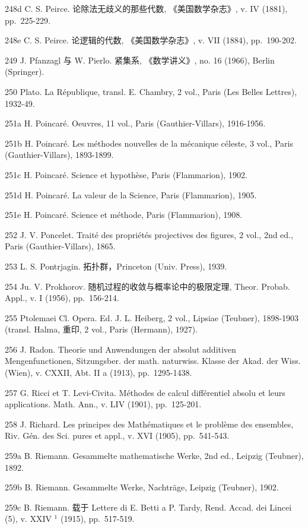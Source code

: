 248d C. S. Peirce. 论除法无歧义的那些代数, 《美国数学杂志》, v. IV (1881), pp.~225-229.

248e C. S. Peirce. 论逻辑的代数, 《美国数学杂志》, v. VII (1884), pp.~190-202.

249 J. Pfanzagl 与 W. Pierlo. 紧集系, 《数学讲义》, no. 16 (1966), Berlin (Springer).

250 Plato. La République, transl. E. Chambry, 2 vol., Paris (Les Belles Lettres), 1932-49.

251a H. Poincaré. Oeuvres, 11 vol., Paris (Gauthier-Villars), 1916-1956.

251b H. Poincaré. Les méthodes nouvelles de la mécanique céleste, 3 vol., Paris (Gauthier-Villars), 1893-1899.

251c H. Poincaré. Science et hypothèse, Paris (Flammarion), 1902.

251d H. Poincaré. La valeur de la Science, Paris (Flammarion), 1905.

251e H. Poincaré. Science et méthode, Paris (Flammarion), 1908.

252 J. V. Poncelet. Traité des propriétés projectives des figures, 2 vol., 2nd ed., Paris (Gauthier-Villars), 1865.

253 L. S. Pontrjagin. 拓扑群，Princeton (Univ. Press), 1939.

254 Ju. V. Prokhorov. 随机过程的收敛与概率论中的极限定理, Theor. Probab. Appl., v. I (1956), pp.~156-214.

255 Ptolemaei Cl. Opera. Ed. J. L. Heiberg, 2 vol., Lipsiae (Teubner), 1898-1903 (transl. Halma, 重印, 2 vol., Paris (Hermann), 1927).

256 J. Radon. Theorie und Anwendungen der absolut additiven Mengenfunctionen, Sitzungsber. der math. naturwiss. Klasse der Akad. der Wiss. (Wien), v. CXXII, Abt. II a (1913), pp.~1295-1438.

257 G. Ricci et T. Levi-Civita. Méthodes de calcul différentiel absolu et leurs applications. Math. Ann., v. LIV (1901), pp.~125-201.

258 J. Richard. Les principes des Mathématiques et le problème des ensembles, Riv. Gén. des Sci. pures et appl., v. XVI (1905), pp.~541-543.

259a B. Riemann. Gesammelte mathematische Werke, 2nd ed., Leipzig (Teubner), 1892.

259b B. Riemann. Gesammelte Werke, Nachträge, Leipzig (Teubner), 1902.

259c B. Riemann. 载于 Lettere di E. Betti a P. Tardy, Rend. Accad. dei Lincei (5), v. XXIV \(^{1}\) (1915), pp.~517-519.

